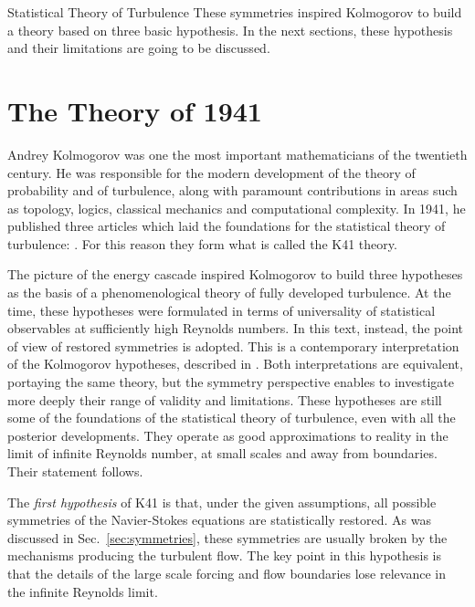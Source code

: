 \begin{chapter}{Statistical Theory of Turbulence}
These symmetries inspired
Kolmogorov to build a theory based on three basic hypothesis.
In the next sections, these hypothesis and their limitations are going to be discussed.

\section{The Theory of 1941} \label{sec:k41}

Andrey Kolmogorov was one the most important mathematicians of the twentieth century.
He was responsible for the modern development of the theory of probability
and of turbulence, along with paramount contributions
in areas such as topology, logics, classical mechanics and computational complexity.
In 1941, he published three articles which laid the foundations
for the statistical theory of turbulence:
\textcite{kolmogorov1941dissipation,kolmogorov1941degeneration,kolmogorov1941local}.
For this reason they form what is called the K41 theory.

The picture of the energy cascade inspired Kolmogorov to
build three hypotheses as the basis of a phenomenological theory of fully developed turbulence.
At the time, these hypotheses were formulated in terms of universality
of statistical observables at sufficiently high Reynolds numbers.
In this text, instead, the point of view of
restored symmetries is adopted. This is a contemporary interpretation of the
Kolmogorov hypotheses, described in
\textcite{frisch1995}. Both interpretations are equivalent, portaying the same theory, but the symmetry perspective enables to investigate more deeply their range of validity and limitations.
These hypotheses are still some of the foundations of the statistical theory of turbulence, even with all the posterior developments.
They operate as good approximations to reality in the limit of infinite Reynolds number, at small scales and away from boundaries. Their statement follows.

The \textit{first hypothesis} of K41 is that, under the given assumptions, all possible symmetries of the Navier-Stokes equations are statistically restored.
As was discussed in Sec.~\ref{sec:symmetries}, these symmetries are usually broken by the mechanisms producing the turbulent flow. The key point in this hypothesis is that the details of the large scale forcing and flow boundaries lose relevance in the infinite Reynolds limit.


\end{chapter}
